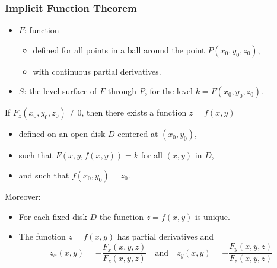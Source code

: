 \begin{frame}
  \frametitle{Implicit Function Theorem}

    \begin{itemize}
      \item $F$: function
      \begin{itemize}
        \item defined for all points in a ball around the point $P(x_0,y_0,z_0)$,
        \item with continuous partial derivatives.
      \end{itemize}
      \item $S$: the level surface of $F$ through $P$, for the level $k = F(x_0,y_0,z_0)$.
    \end{itemize}

\pause If $F_z(x_0,y_0,z_0) \neq 0$, then there exists a function $z=f(x,y)$
\begin{itemize}
  \item defined on an open disk $D$ centered at $(x_0,y_0)$,
  \item such that $F(x,y,f(x,y)) = k$ for all $(x,y)$ in $D$,
  \item and such that $f(x_0,y_0) = z_0$.
\end{itemize}

\pause Moreover:
\begin{itemize}
  \item For each fixed disk $D$ the function $z=f(x,y)$ is unique.
  \item The function $z=f(x,y)$ has partial derivatives and
%
$$z_x(x,y) = -\frac{F_x(x,y,z)}{F_z(x,y,z)}\quad \text{and}\quad z_y(x,y) = -\frac{F_y(x,y,z)}{F_z(x,y,z)}$$
\end{itemize}
\end{frame}